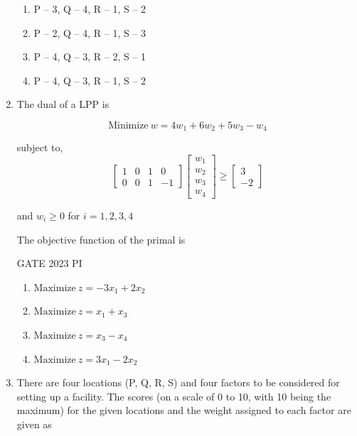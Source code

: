 \documentclass[journal,12pt,onecolumn]{IEEEtran}
\theoremstyle{remark}
\begin{document}
\begin{enumerate}
\begin{multicols}{2}
\begin{enumerate}
    \item P -- 3, Q -- 4, R -- 1, S -- 2
    \item P -- 2, Q -- 4, R -- 1, S -- 3
    \item P -- 4, Q -- 3, R -- 2, S -- 1
    \item P -- 4, Q -- 3, R -- 1, S -- 2
\end{enumerate}
\end{multicols}
\item The dual of a LPP is

\begin{equation*}
\text{Minimize}\ w = 4w_1 + 6w_2 + 5w_3 - w_4
\end{equation*}

subject to,
\begin{equation*}
\begin{bmatrix}
1 & 0 & 1 & 0 \\
0 & 0 & 1 & -1
\end{bmatrix}
\begin{bmatrix}
w_1 \\ w_2 \\ w_3 \\ w_4
\end{bmatrix}
\geq
\begin{bmatrix}
3 \\ -2
\end{bmatrix}
\end{equation*}

and $w_i \geq 0$ \quad for \quad $i = 1, 2, 3, 4$

The objective function of the primal is

\hfill{GATE 2023 PI}

\begin{multicols}{2}
\begin{enumerate}
    \item $\text{Maximize}\ z = -3x_1 + 2x_2$
    \item $\text{Maximize}\ z = x_1 + x_3$
    \item $\text{Maximize}\ z = x_3 - x_4$
    \item $\text{Maximize}\ z = 3x_1 - 2x_2$
\end{enumerate}
\end{multicols}
\item There are four locations (P, Q, R, S) and four factors to be considered for setting up a facility. The scores (on a scale of 0 to 10, with 10 being the maximum) for the given locations and the weight assigned to each factor are given as


\end{enumerate}
\end{document}
